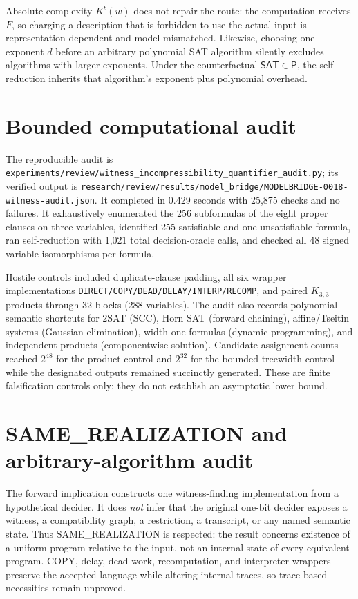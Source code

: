 \documentclass[11pt]{article}
\newcommand{\SAT}{\mathsf{SAT}}
\begin{document}
Absolute complexity $K^t(w)$ does not repair the route: the computation receives $F$, so charging a description that is forbidden to use the actual input is representation-dependent and model-mismatched.  Likewise, choosing one exponent $d$ before an arbitrary polynomial SAT algorithm silently excludes algorithms with larger exponents.  Under the counterfactual $\SAT\in\mathsf P$, the self-reduction inherits that algorithm's exponent plus polynomial overhead.

\section{Bounded computational audit}

The reproducible audit is \texttt{experiments/review/witness\_incompressibility\_quantifier\_audit.py}; its verified output is \texttt{research/review/results/model\_bridge/MODELBRIDGE-0018-witness-audit.json}.  It completed in 0.429 seconds with 25,875 checks and no failures.  It exhaustively enumerated the 256 subformulas of the eight proper clauses on three variables, identified 255 satisfiable and one unsatisfiable formula, ran self-reduction with 1,021 total decision-oracle calls, and checked all 48 signed variable isomorphisms per formula.

Hostile controls included duplicate-clause padding, all six wrapper implementations \texttt{DIRECT/COPY/DEAD/DELAY/INTERP/RECOMP}, and paired $K_{3,3}$ products through 32 blocks (288 variables).  The audit also records polynomial semantic shortcuts for 2SAT (SCC), Horn SAT (forward chaining), affine/Tseitin systems (Gaussian elimination), width-one formulas (dynamic programming), and independent products (componentwise solution).  Candidate assignment counts reached $2^{48}$ for the product control and $2^{32}$ for the bounded-treewidth control while the designated outputs remained succinctly generated.  These are finite falsification controls only; they do not establish an asymptotic lower bound.

\section{SAME\_REALIZATION and arbitrary-algorithm audit}

The forward implication constructs one witness-finding implementation from a hypothetical decider.  It does \emph{not} infer that the original one-bit decider exposes a witness, a compatibility graph, a restriction, a transcript, or any named semantic state.  Thus SAME\_REALIZATION is respected: the result concerns existence of a uniform program relative to the input, not an internal state of every equivalent program.  COPY, delay, dead-work, recomputation, and interpreter wrappers preserve the accepted language while altering internal traces, so trace-based necessities remain unproved.
\end{document}
